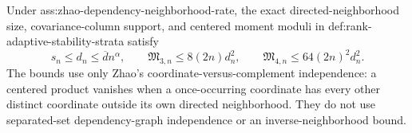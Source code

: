 Under ass:zhao-dependency-neighborhood-rate, the exact directed-neighborhood size, covariance-column support, and centered moment moduli in def:rank-adaptive-stability-strata satisfy
\[
s_n\le d_n\le\overline d n^\alpha,
\qquad
\mathfrak M_{3,n}\le8(2n)d_n^2,
\qquad
\mathfrak M_{4,n}\le64(2n)^2d_n^2.
\]
The bounds use only Zhao's coordinate-versus-complement independence: a centered product vanishes when a once-occurring coordinate has every other distinct coordinate outside its own directed neighborhood.  They do not use separated-set dependency-graph independence or an inverse-neighborhood bound.